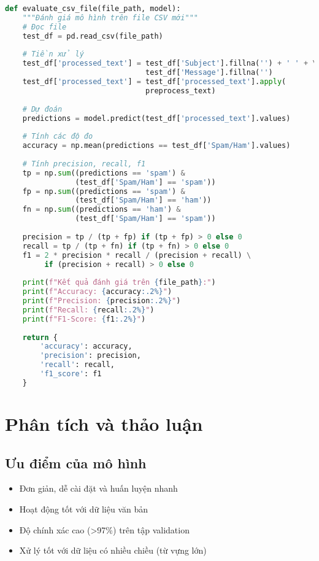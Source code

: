 \begin{lstlisting}[language=Python]
def evaluate_csv_file(file_path, model):
    """Đánh giá mô hình trên file CSV mới"""
    # Đọc file
    test_df = pd.read_csv(file_path)
    
    # Tiền xử lý
    test_df['processed_text'] = test_df['Subject'].fillna('') + ' ' + \
                                test_df['Message'].fillna('')
    test_df['processed_text'] = test_df['processed_text'].apply(
                                preprocess_text)
    
    # Dự đoán
    predictions = model.predict(test_df['processed_text'].values)
    
    # Tính các độ đo
    accuracy = np.mean(predictions == test_df['Spam/Ham'].values)
    
    # Tính precision, recall, f1
    tp = np.sum((predictions == 'spam') & 
                (test_df['Spam/Ham'] == 'spam'))
    fp = np.sum((predictions == 'spam') & 
                (test_df['Spam/Ham'] == 'ham'))
    fn = np.sum((predictions == 'ham') & 
                (test_df['Spam/Ham'] == 'spam'))
    
    precision = tp / (tp + fp) if (tp + fp) > 0 else 0
    recall = tp / (tp + fn) if (tp + fn) > 0 else 0
    f1 = 2 * precision * recall / (precision + recall) \
         if (precision + recall) > 0 else 0
    
    print(f"Kết quả đánh giá trên {file_path}:")
    print(f"Accuracy: {accuracy:.2%}")
    print(f"Precision: {precision:.2%}")
    print(f"Recall: {recall:.2%}")
    print(f"F1-Score: {f1:.2%}")
    
    return {
        'accuracy': accuracy,
        'precision': precision,
        'recall': recall,
        'f1_score': f1
    }
\end{lstlisting}

\section{Phân tích và thảo luận}

\subsection{Ưu điểm của mô hình}
\begin{itemize}
    \item Đơn giản, dễ cài đặt và huấn luyện nhanh
    \item Hoạt động tốt với dữ liệu văn bản
    \item Độ chính xác cao (>97\%) trên tập validation
    \item Xử lý tốt với dữ liệu có nhiều chiều (từ vựng lớn)
\end{itemize}

